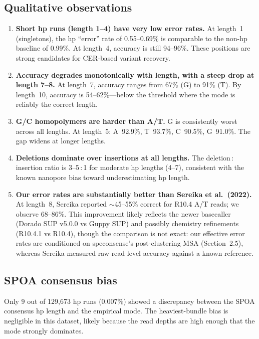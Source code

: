 \documentclass[11pt]{article}
\begin{document}
\subsection{Qualitative observations}

\begin{enumerate}
\item \textbf{Short hp runs (length 1--4) have very low error rates.} At
  length~1 (singletons), the hp ``error'' rate of 0.55--0.69\% is comparable to
  the non-hp baseline of 0.99\%. At length~4, accuracy is still 94--96\%. These
  positions are strong candidates for CER-based variant recovery.

\item \textbf{Accuracy degrades monotonically with length, with a steep drop at
  length 7--8.} At length~7, accuracy ranges from 67\% (G) to 91\% (T). By
  length~10, accuracy is 54--62\%---below the threshold where the mode is
  reliably the correct length.

\item \textbf{G/C homopolymers are harder than A/T.} G is consistently worst
  across all lengths. At length~5: A~92.9\%, T~93.7\%, C~90.5\%, G~91.0\%.
  The gap widens at longer lengths.

\item \textbf{Deletions dominate over insertions at all lengths.} The
  deletion\,:\,insertion ratio is 3--5\,:\,1 for moderate hp lengths (4--7),
  consistent with the known nanopore bias toward underestimating hp length.

\item \textbf{Our error rates are substantially better than Sereika et
  al.~(2022).} At length~8, Sereika reported ${\sim}$45--55\% correct for
  R10.4 A/T reads; we observe 68--86\%. This improvement likely reflects the
  newer basecaller (Dorado SUP v5.0.0 vs Guppy SUP) and possibly chemistry
  refinements (R10.4.1 vs R10.4), though the comparison is not exact: our
  effective error rates are conditioned on speconsense's post-clustering MSA
  (Section~2.5), whereas Sereika measured raw read-level accuracy against a
  known reference.
\end{enumerate}

\subsection{SPOA consensus bias}

Only 9 out of 129,673 hp runs (0.007\%) showed a discrepancy between the SPOA
consensus hp length and the empirical mode. The heaviest-bundle bias is
negligible in this dataset, likely because the read depths are high enough that
the mode strongly dominates.
\end{document}
